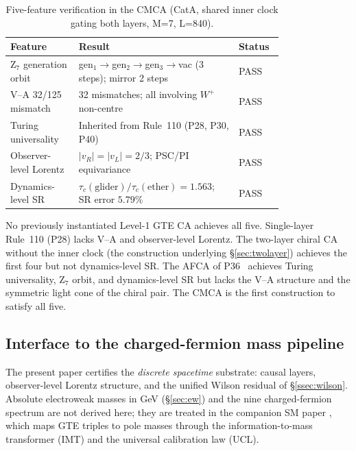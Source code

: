 \documentclass[11pt]{article}
\theoremstyle{remark}
\begin{document}
\begin{table}[h]
  \centering
  \small
  \caption{Five-feature verification in the CMCA (CatA, shared inner clock gating both layers,
    M=7, L=840).}
  \label{tab:five_features}
  \begin{tabular}{P{0.22\linewidth}P{0.45\linewidth}P{0.12\linewidth}}
    \toprule
    Feature & Result & Status \\
    \midrule
    Z$_7$ generation orbit & gen$_1\to$gen$_2\to$gen$_3\to$vac (3 steps);
                              mirror 2 steps & PASS \\
    V--A 32/125 mismatch & 32 mismatches; all involving $W^+$ non-centre & PASS \\
    Turing universality & Inherited from Rule~110 (P28, P30, P40) & PASS \\
    Observer-level Lorentz & $|v_R|=|v_L|=2/3$; PSC/PI equivariance & PASS \\
    Dynamics-level SR & $\tau_c(\text{glider})/\tau_c(\text{ether})=1.563$;
                         SR error $5.79\%$ & PASS \\
    \bottomrule
  \end{tabular}
\end{table}

No previously instantiated Level-1 GTE CA achieves all five.  Single-layer
Rule~110 (P28) lacks V--A and observer-level Lorentz.  The two-layer chiral
CA without the inner clock (the construction underlying §\ref{sec:twolayer})
achieves the first four but not dynamics-level SR.  The AFCA of
P36~\cite{SpivackEmergentGravity} achieves Turing universality, Z$_7$ orbit,
and dynamics-level SR but lacks the V--A structure and the symmetric light cone
of the chiral pair.  The CMCA is the first construction to satisfy all five.

\subsection{Interface to the charged-fermion mass pipeline}
\label{ssec:mass_interface}

The present paper certifies the \emph{discrete spacetime} substrate: causal layers,
observer-level Lorentz structure, and the unified Wilson residual of
\S\ref{ssec:wilson}.
Absolute electroweak masses in GeV (\S\ref{sec:ew}) and the nine charged-fermion
spectrum are not derived here; they are treated in the companion SM paper
\cite{SpivackSM}, which maps GTE triples to pole masses through the
information-to-mass transformer (IMT) and the universal calibration law (UCL).
\end{document}
